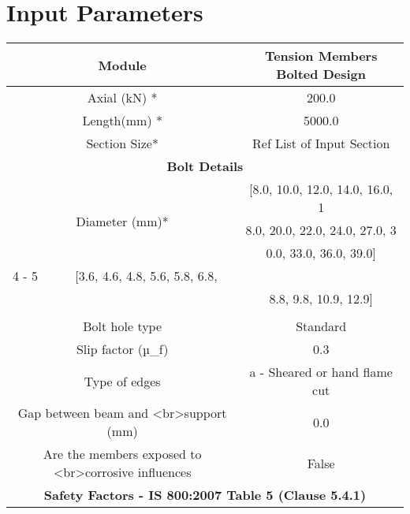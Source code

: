 \documentclass{article}%
\begin{document}
%
\normalsize%
\pagestyle{header}%
\section{Input Parameters}%
\label{sec:InputParameters}%
\renewcommand{\arraystretch}{1.2}%
\begin{longtable}{|p{5cm}|p{2cm}|p{2cm}|p{2cm}|p{5cm}|}%
\hline%
\hline%
\multicolumn{3}{|c|}{Module}&\multicolumn{2}{|c|}{Tension Members Bolted Design}\\%
\hline%
\hline%
\multicolumn{3}{|c|}{Axial (kN) *}&\multicolumn{2}{|c|}{200.0}\\%
\hline%
\hline%
\multicolumn{3}{|c|}{Length(mm) *}&\multicolumn{2}{|c|}{5000.0}\\%
\hline%
\hline%
\multicolumn{3}{|c|}{Section Size*}&\multicolumn{2}{|c|}{Ref List of Input Section}\\%
\hline%
\hline%
\multicolumn{5}{|c|}{\textbf{Bolt Details}}\\%
\hline%
\multicolumn{3}{|c|}{\multirow{3}{*}{Diameter (mm)*}}&\multicolumn{2}{|c|}{{[}8.0, 10.0, 12.0, 14.0, 16.0, 1}\\%
\multicolumn{3}{|c|}{\multirow{3}{*}{}}&\multicolumn{2}{|c|}{8.0, 20.0, 22.0, 24.0, 27.0, 3}\\%
\multicolumn{3}{|c|}{\multirow{3}{*}{}}&\multicolumn{2}{|c|}{0.0, 33.0, 36.0, 39.0{]}}\\%
\cline{4%
-%
5}%
\multicolumn{3}{|c|}{\multirow{2}{*}{Grade *}}&\multicolumn{2}{|c|}{{[}3.6, 4.6, 4.8, 5.6, 5.8, 6.8, }\\%
\multicolumn{3}{|c|}{\multirow{2}{*}{}}&\multicolumn{2}{|c|}{8.8, 9.8, 10.9, 12.9{]}}\\%
\cline{4%
-%
5}%
\hline%
\multicolumn{3}{|c|}{Type *}&\multicolumn{2}{|c|}{Bearing Bolt}\\%
\hline%
\hline%
\multicolumn{3}{|c|}{Bolt hole type}&\multicolumn{2}{|c|}{Standard}\\%
\hline%
\hline%
\multicolumn{3}{|c|}{Slip factor (µ\_f)}&\multicolumn{2}{|c|}{0.3}\\%
\hline%
\hline%
\multicolumn{3}{|c|}{Type of edges}&\multicolumn{2}{|c|}{a {-} Sheared or hand flame cut}\\%
\hline%
\hline%
\multicolumn{3}{|c|}{Gap between beam and <br>support (mm)}&\multicolumn{2}{|c|}{0.0}\\%
\hline%
\hline%
\multicolumn{3}{|c|}{Are the members exposed to <br>corrosive influences}&\multicolumn{2}{|c|}{False}\\%
\hline%
\hline%
\multicolumn{5}{|c|}{\textbf{Safety Factors {-} IS 800:2007 Table 5 (Clause 5.4.1) }}\\%

\end{longtable}
\end{document}
